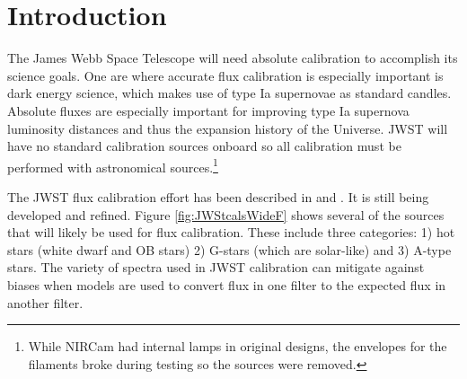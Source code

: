 \documentclass{aastex6}
\begin{document}




\section{Introduction}

The James Webb Space Telescope \citep[JWST; e.g.][]{gardner2006SSRv} will need absolute calibration to accomplish its science goals.
One are where accurate flux calibration is especially important is dark energy science, which makes use of type Ia supernovae as standard candles.
Absolute fluxes are especially important for improving type Ia supernova luminosity distances and thus the expansion history of the Universe.
JWST will have no standard calibration sources onboard so all calibration must be performed with astronomical sources.\footnote{While NIRCam had internal lamps in original designs, the envelopes for the filaments broke during testing so the sources were removed.}

The JWST flux calibration effort has been described in \citet{gordon2009fluxplan1} and \citet{gordon2011fluxplan2}.
It is still being developed and refined.
Figure \ref{fig:JWStcalsWideF} shows several of the sources that will likely be used for flux calibration.
These include three categories: 1) hot stars (white dwarf and OB stars) 2) G-stars (which are solar-like) and 3) A-type stars.
The variety of spectra used in JWST calibration can mitigate against biases when models are used to convert flux in one filter to the expected flux in another filter.
\end{document}
